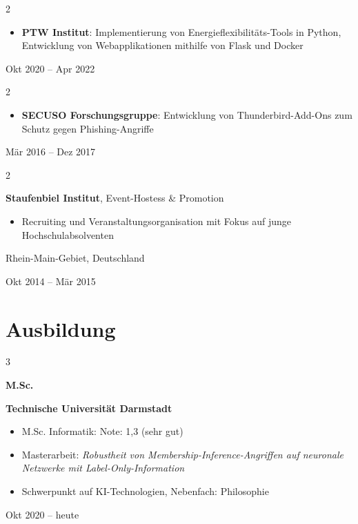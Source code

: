 \documentclass[10pt, letterpaper]{article}
\newenvironment{highlights}{
    \begin{itemize}[
        topsep=0.10 cm,
        parsep=0.10 cm,
        partopsep=0pt,
        itemsep=0pt,
        leftmargin=0.4 cm + 10pt
    ]
}{
    \end{itemize}
} %
\newenvironment{twocolentry}[2][]{
    \onecolentry
    \def\secondColumn{#2}
    \setcolumnwidth{\fill, 4.5 cm}
    \begin{paracol}{2}
}{
    \switchcolumn \raggedleft \secondColumn
    \end{paracol}
    \endonecolentry
} %
\newenvironment{threecolentry}[3][]{
    \onecolentry
    \def\thirdColumn{#3}
    \setcolumnwidth{1 cm, \fill, 4.5 cm}
    \begin{paracol}{3}
    {\raggedright #2} \switchcolumn
}{
    \switchcolumn \raggedleft \thirdColumn
    \end{paracol}
    \endonecolentry
} %
\begin{document}
\begin{twocolentry}{

    Okt 2020 – Apr 2022
}
    \begin{highlights}
        \item \textbf{PTW Institut}: Implementierung von Energieflexibilitäts-Tools in Python, Entwicklung von Webapplikationen mithilfe von Flask und Docker
    \end{highlights}
\end{twocolentry}


\begin{twocolentry}{

    Mär 2016 – Dez 2017
}
    \begin{highlights}
        \item \textbf{SECUSO Forschungsgruppe}: Entwicklung von Thunderbird-Add-Ons zum Schutz gegen Phishing-Angriffe
    \end{highlights}
\end{twocolentry}

\hspace{0.2cm}
\begin{twocolentry}{
    Rhein-Main-Gebiet, Deutschland

    Okt 2014 – Mär 2015
}
    \textbf{Staufenbiel Institut}, Event-Hostess \& Promotion
    \begin{highlights}
        \item Recruiting und Veranstaltungsorganisation mit Fokus auf junge Hochschulabsolventen
    \end{highlights}
\end{twocolentry}

\section{Ausbildung}

\begin{threecolentry}{\textbf{M.Sc.}}{
    Okt 2020 – heute
}
    \textbf{Technische Universität Darmstadt}
    \begin{highlights}
        \item M.Sc. Informatik: Note: 1,3 (sehr gut)
        \item Masterarbeit: \textit{Robustheit von Membership-Inference-Angriffen auf neuronale Netzwerke mit Label-Only-Information}
        \item Schwerpunkt auf KI-Technologien, Nebenfach: Philosophie
    \end{highlights}
\end{threecolentry}
\end{document}
